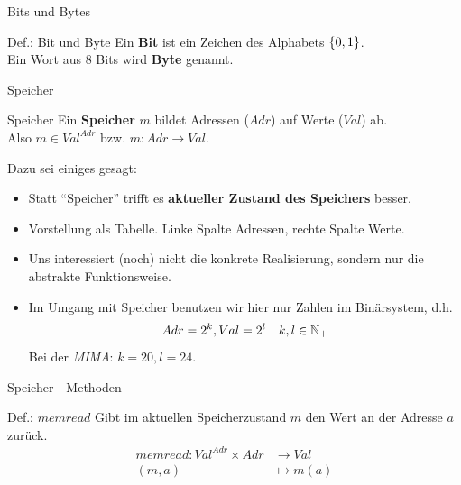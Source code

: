 \begin{frame}{Bits und Bytes}
	\begin{block}{Def.: Bit und Byte}
		Ein \textbf{Bit} ist ein Zeichen des Alphabets $\left\{ 0,1 \right\}$. \\
		Ein Wort aus 8 Bits wird \textbf{Byte} genannt. 
	\end{block}
\end{frame}
\begin{frame}{Speicher}
	\begin{block}{Speicher}
		Ein \textbf{Speicher} $m$ bildet Adressen ($Adr$) auf Werte ($Val$) ab.\\
		Also $m \in Val^{Adr}$ bzw. $m \colon Adr \to Val$.
	\end{block}

	\begin{exampleblock}{Dazu sei einiges gesagt:}
		\begin{itemize}
			\item Statt ``Speicher'' trifft es \textbf{aktueller Zustand des Speichers} besser.
			\item Vorstellung als Tabelle. Linke Spalte Adressen, rechte Spalte Werte.
			\item Uns interessiert (noch) nicht die konkrete Realisierung, sondern nur die abstrakte Funktionsweise.
			\item Im Umgang mit Speicher benutzen wir hier nur Zahlen im Binärsystem, d.h.
				$$Adr = 2^k, Val = 2^l \quad k,l \in \mathbb{N}_+$$
				Bei der \emph{MIMA}: $k=20, l=24$.
		\end{itemize}
	\end{exampleblock}
\end{frame}

\begin{frame}{Speicher - Methoden}
	\begin{block}{Def.: $memread$}
		Gibt im aktuellen Speicherzustand $m$ den Wert an der Adresse $a$ zurück.
		\begin{align*}
			memread : Val^{Adr} \times Adr &\to Val \\
									(m,a) &\mapsto m(a)
	\end{align*}
	\end{block}
\end{frame}

